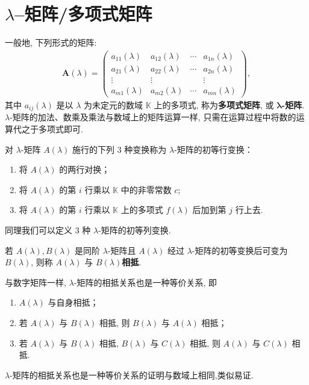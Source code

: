 \documentclass[../../main.tex]{subfiles}%
\begin{document}
\section{$\lambda$--矩阵/多项式矩阵}

\begin{definition}[$\lambda$-矩阵]
一般地, 下列形式的矩阵:
\begin{align*}
\boldsymbol{A}(\lambda)=
\begin{pmatrix}
a_{11}(\lambda) & a_{12}(\lambda) & \cdots & a_{1n}(\lambda) \\
a_{21}(\lambda) & a_{22}(\lambda) & \cdots & a_{2n}(\lambda) \\
\vdots & \vdots & & \vdots \\
a_{m1}(\lambda) & a_{m2}(\lambda) & \cdots & a_{mn}(\lambda)
\end{pmatrix},
\end{align*}
其中 $a_{ij}(\lambda)$ 是以 $\lambda$ 为未定元的数域 $\mathbb{K}$ 上的多项式, 称为\textbf{多项式矩阵}, 或 $\boldsymbol{\lambda}$\textbf{-矩阵}. $\lambda$-矩阵的加法、数乘及乘法与数域上的矩阵运算一样, 只需在运算过程中将数的运算代之于多项式即可.
\end{definition}

\begin{definition}
对 $\lambda$-矩阵 $A(\lambda)$ 施行的下列 3 种变换称为 $\lambda$-矩阵的初等行变换：
\begin{enumerate}[(1)]
\item 将 $A(\lambda)$ 的两行对换；

\item 将 $A(\lambda)$ 的第 $i$ 行乘以 $\mathbb{K}$ 中的非零常数 $c$;

\item 将 $A(\lambda)$ 的第 $i$ 行乘以 $\mathbb{K}$ 上的多项式 $f(\lambda)$ 后加到第 $j$ 行上去.
\end{enumerate}

同理我们可以定义 3 种 $\lambda$-矩阵的初等列变换.
\end{definition}

\begin{definition}
若 $A(\lambda),B(\lambda)$ 是同阶 $\lambda$-矩阵且 $A(\lambda)$ 经过 $\lambda$-矩阵的初等变换后可变为 $B(\lambda)$, 则称 $A(\lambda)$ 与 $B(\lambda)$\textbf{相抵}.

与数字矩阵一样, $\lambda$-矩阵的相抵关系也是一种等价关系, 即
\begin{enumerate}[(1)]
\item $A(\lambda)$ 与自身相抵；

\item 若 $A(\lambda)$ 与 $B(\lambda)$ 相抵, 则 $B(\lambda)$ 与 $A(\lambda)$ 相抵；

\item 若 $A(\lambda)$ 与 $B(\lambda)$ 相抵, $B(\lambda)$ 与 $C(\lambda)$ 相抵, 则 $A(\lambda)$ 与 $C(\lambda)$ 相抵.
\end{enumerate}
\end{definition}
\begin{note}
$\lambda$-矩阵的相抵关系也是一种等价关系的证明与数域上相同,类似易证.
\end{note}
\end{document}
